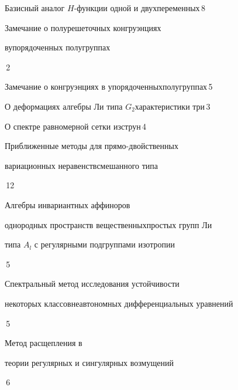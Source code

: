 

{Базисный аналог $H$-функции одной и двух\newline переменных}{\No\,8}






{Замечание о полурешеточных конгруэнциях


в\newline упорядоченных полугруппах}{\No\,2}




{Замечание о конгруэнциях в упорядоченных\newline полугруппах}{\No\,5}




{О деформациях алгебры Ли типа $G_{2}$\newline характеристики три}{\No\,3}




{О спектре равномерной сетки из\newline струн}{\No\,4}




{Приближенные методы для прямо-двойственных 


вариационных неравенств\newline смешанного типа}{\No\,12}




{Алгебры инвариантных аффиноров


однородных пространств вещественных\newline простых групп Ли


типа $A_l$ с регулярными подгруппами изотропии}{\No\,5}




{Спектральный метод исследования устойчивости  


некоторых классов\newline неавтономных дифференциальных уравнений}{\No\,5}




{Метод расщепления в 


теории регулярных и сингулярных возмущений}{\No\,6}




